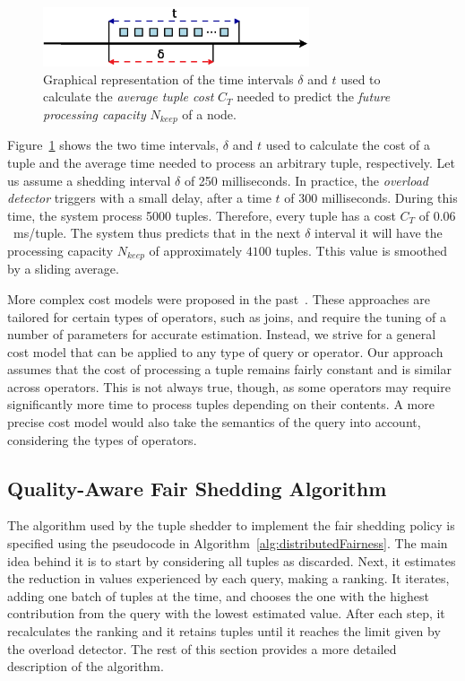 \begin{figure}  
	\centering
	\includegraphics[width=0.7\textwidth]{img/tesi/tuple_cost} 
	\caption{Graphical representation of the time intervals $\delta$ and $t$ used to calculate the
	\emph{average tuple cost} $C_T$ needed to predict the \emph{future processing capacity}
	$N_{keep}$ of a node.}
	\label{fig:tuple_cost}
\end{figure} 

Figure~\ref{fig:tuple_cost} shows the two time intervals, $\delta$ and $t$ used to calculate the cost of
a tuple and the average time needed to process an arbitrary tuple, respectively. Let us assume a shedding
interval $\delta$ of 250 milliseconds. In practice, the \emph{overload detector} triggers with a small
delay, \eg after a time $t$ of 300 milliseconds. During this time, the system process 5000 tuples.
Therefore, every tuple has a cost $C_T$ of $0.06$~ms/tuple. The system thus predicts that in the next $\delta$ interval it will
have the processing capacity $N_{keep}$ of approximately  $4100$ tuples. Tthis value is
smoothed by a sliding average.

More complex cost models were proposed in the past~\cite{expensivepredicatejoin07,
evaluatingwindow03}. These approaches are tailored for certain types of operators, such as joins, and
require the tuning of a number of parameters for accurate estimation. Instead, we strive for a general
cost model that can be applied to any type of query or operator. Our approach assumes that the cost of processing a tuple
remains fairly constant and is similar across operators. This is not always true, though, as some
operators may require significantly more time to process tuples depending on their contents. A
more precise cost model would also take the semantics of the query into account, \eg considering the
types of operators. 

\subsection*{Quality-Aware Fair Shedding Algorithm}
\label{sec:fairness-algo}

The algorithm used by the tuple shedder to implement the fair shedding policy is specified using the
pseudocode in Algorithm~\ref{alg:distributedFairness}. The main idea behind it is to start by considering
all tuples as discarded. Next, it estimates the reduction in \sic values experienced by each query,
making a ranking. It iterates, adding one batch of tuples at the time, and chooses the one with the
highest \sic contribution from the query with the lowest estimated \sic value. After each step, it
recalculates the ranking and it retains tuples until it reaches the limit given by the overload
detector. The rest of this section provides a more detailed description of the algorithm.

